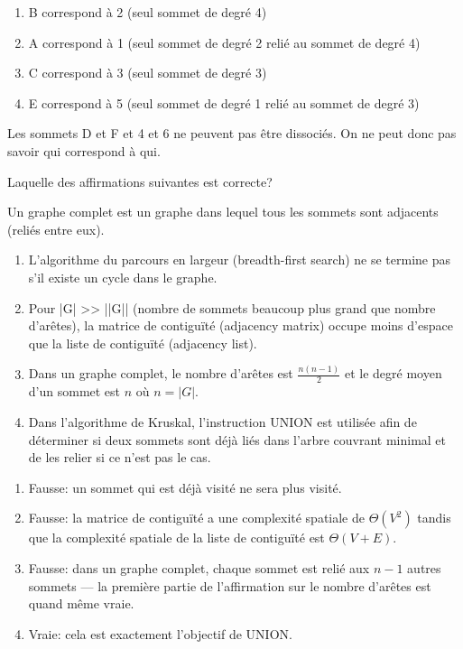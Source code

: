 \begin{Exercice}[5 minutes]
\begin{conseil}
    \end{conseil}
    \begin{solution}
        \begin{enumerate}
            \item B correspond à 2 (seul sommet de degré 4)
            \item A correspond à 1 (seul sommet de degré 2 relié au sommet de degré 4)
            \item C correspond à 3 (seul sommet de degré 3)
            \item E correspond à 5 (seul sommet de degré 1 relié au sommet de degré 3)
        \end{enumerate}
        Les sommets D et F et 4 et 6 ne peuvent pas être dissociés. On ne peut donc pas savoir qui correspond à qui.
    \end{solution}
\end{Exercice}


\begin{Exercice}[5 minutes]
Laquelle des affirmations suivantes est correcte?
\begin{conseil}
Un graphe complet est un graphe dans lequel tous les sommets sont adjacents (reliés entre eux). 
\end{conseil}
\begin{enumerate}
\item L'algorithme du parcours en largeur (breadth-first search) ne se termine pas s'il existe un cycle dans le graphe.
\item Pour |G| >> ||G|| (nombre de sommets beaucoup plus grand que nombre d'arêtes), la matrice de contiguïté (adjacency matrix) occupe moins d'espace que la liste de contiguïté (adjacency list).
\item Dans un graphe complet, le nombre d'arêtes est $\frac{n(n-1)}{2}$ et le degré moyen d'un sommet est $n$ où $n=|G|$.
\item Dans l'algorithme de Kruskal, l'instruction \textsc{UNION} est utilisée afin de déterminer si deux sommets sont déjà liés dans l'arbre couvrant minimal et de les relier si ce n'est pas le cas. 
\end{enumerate}
\begin{solution}
    \begin{enumerate}
        \item Fausse: un sommet qui est déjà visité ne sera plus visité.
        \item Fausse: la matrice de contiguïté a une complexité spatiale de $\Theta(V^2)$ tandis que la complexité spatiale de la liste de contiguïté est $\Theta(V+E)$. 
        \item Fausse: dans un graphe complet, chaque sommet est relié aux $n-1$ autres sommets — la première partie de l'affirmation sur le nombre d'arêtes est quand même vraie.
        \item Vraie: cela est exactement l'objectif de \textsc{UNION}. 
    \end{enumerate}
 
\end{solution}
\end{Exercice}

